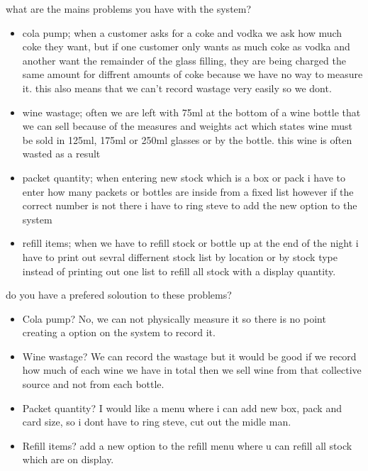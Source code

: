  what are the mains problems you have with the system?
\begin{itemize}
	\item cola pump; when a customer asks for a coke and vodka we ask how much coke they want, but if one customer only wants as much coke as vodka and another want the remainder of the glass filling, they are being charged the same amount for diffrent amounts of coke because we have no way to measure it. this also means that we can't record wastage very easily so we dont.
	\item wine wastage; often we are left with 75ml at the bottom of a wine bottle that we can sell because of the measures and weights act which states wine must be sold in 125ml, 175ml or 250ml glasses or by the bottle. this wine is often wasted as a result
	\item packet quantity; when entering new stock which is a box or pack i have to enter how many packets or bottles are inside from a fixed list however if the correct number is not there i have to ring steve to add the new option to the system
	\item refill items; when we have to refill stock or bottle up at the end of the night i have to print out sevral differnent stock list by location or by stock type instead of printing out one list to refill all stock with a display quantity.
\end{itemize}

do you have a prefered soloution to these problems?
\begin{itemize}
	\item Cola pump? No, we can not physically measure it so there is no point creating a option on the system to record it.
	\item Wine wastage? We can record the wastage but it would be good if we record how much of each wine we have in total then we sell wine from that collective source and not from each bottle.
	\item Packet quantity? I would like a menu where i can add new box, pack and card size, so i dont have to ring steve, cut out the midle man.
	\item Refill items? add a new option to the refill menu where u can refill all stock which are on display.
\end{itemize}

